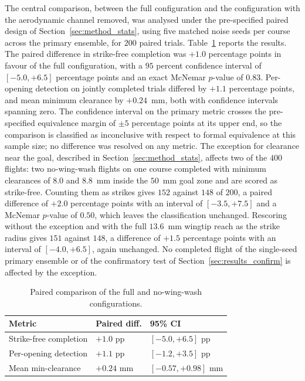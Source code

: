 \documentclass[final,5p,times]{elsarticle}
\begin{document}
The central comparison, between the full configuration and the configuration with the aerodynamic channel removed, was analysed under the pre-specified paired design of Section~\ref{sec:method_stats}, using five matched noise seeds per course across the primary ensemble, for $200$ paired trials. Table~\ref{tab:stats} reports the results. The paired difference in strike-free completion was $+1.0$ percentage points in favour of the full configuration, with a $95$ percent confidence interval of $[-5.0, +6.5]$ percentage points and an exact McNemar $p$-value of $0.83$. Per-opening detection on jointly completed trials differed by $+1.1$ percentage points, and mean minimum clearance by $+0.24$~mm, both with confidence intervals spanning zero. The confidence interval on the primary metric crosses the pre-specified equivalence margin of $\pm 5$ percentage points at its upper end, so the comparison is classified as inconclusive with respect to formal equivalence at this sample size; no difference was resolved on any metric. The exception for clearance near the goal, described in Section~\ref{sec:method_stats}, affects two of the $400$ flights: two no-wing-wash flights on one course completed with minimum clearances of $8.0$ and $8.8$~mm inside the $50$~mm goal zone and are scored as strike-free. Counting them as strikes gives $152$ against $148$ of $200$, a paired difference of $+2.0$ percentage points with an interval of $[-3.5, +7.5]$ and a McNemar $p$-value of $0.50$, which leaves the classification unchanged. Rescoring without the exception and with the full $13.6$~mm wingtip reach as the strike radius gives $151$ against $148$, a difference of $+1.5$ percentage points with an interval of $[-4.0, +6.5]$, again unchanged. No completed flight of the single-seed primary ensemble or of the confirmatory test of Section~\ref{sec:results_confirm} is affected by the exception.

\begin{table}[t]
\centering
\caption{Paired comparison of the full and no-wing-wash configurations.}
\label{tab:stats}
\footnotesize\setlength{\tabcolsep}{3pt}
\begin{tabular*}{\columnwidth}{@{\extracolsep{\fill}}lll@{}}
\toprule
Metric & Paired diff. & 95\% CI \\
\midrule
Strike-free completion & $+1.0$ pp & $[-5.0, +6.5]$ pp \\
Per-opening detection & $+1.1$ pp & $[-1.2, +3.5]$ pp \\
Mean min-clearance & $+0.24$ mm & $[-0.57, +0.98]$ mm \\
\bottomrule
\end{tabular*}
\end{table}
\end{document}

